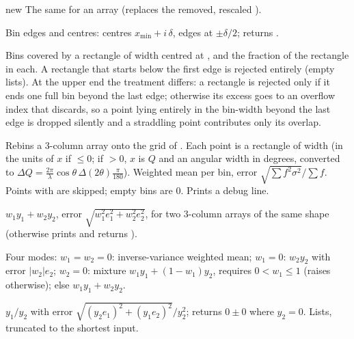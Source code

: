 \documentclass[11pt,a4paper]{article}
\begin{document}
 \textsf{\footnotesize\colorbox{green!15}{new}}
The same for an array (replaces the removed, rescaled ).


 
Bin edges and centres: centres $x_\mathrm{min} + i\,\delta$, edges at
$\pm\delta/2$; returns .

Bins covered by a rectangle of width  centred at , and
the fraction of the rectangle in each. A rectangle that starts below the
first edge is rejected entirely (empty lists). At the upper end the
treatment differs: a rectangle is rejected only if it ends one full bin
beyond the last edge; otherwise its excess goes to an overflow index that
 discards, so a point lying entirely in the bin-width beyond
the last edge is dropped silently and a straddling point contributes only
its overlap.

 
Rebins a 3-column array onto the grid of . Each point is a
rectangle of width  (in the units of $x$ if $\le0$;
if $>0$, $x$ is $Q$ and  an angular width in degrees,
converted to $\Delta Q = \frac{2\pi}{\lambda}\cos\theta\,\Delta(2\theta)\frac{\pi}{180}$).
Weighted mean per bin, error $\sqrt{\sum f^2\sigma^2}/\sum f$. Points with
 are skipped; empty bins are 0. Prints a debug line.


 
$w_1y_1+w_2y_2$, error $\sqrt{w_1^2e_1^2+w_2^2e_2^2}$, for two 3-column
arrays of the same shape (otherwise prints and returns ).

 
Four modes: $w_1=w_2=0$: inverse-variance weighted mean; $w_1=0$: $w_2y_2$
with error $|w_2|e_2$; $w_2=0$: mixture $w_1y_1+(1-w_1)y_2$, requires
$0<w_1\le1$ (raises otherwise); else $w_1y_1+w_2y_2$.

$y_1/y_2$ with error $\sqrt{(y_2e_1)^2+(y_1e_2)^2}/y_2^2$; returns $0\pm0$
where $y_2=0$. Lists, truncated to the shortest input. \legacy
\end{document}
